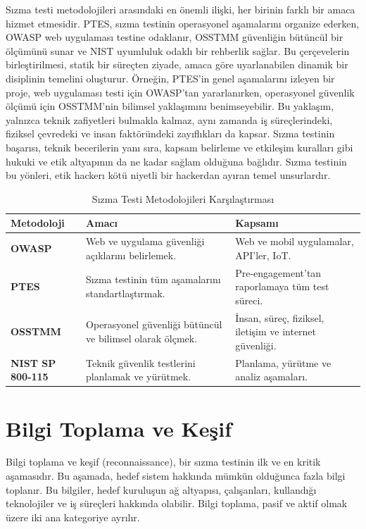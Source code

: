 Sızma testi metodolojileri arasındaki en önemli ilişki, her birinin farklı bir amaca hizmet etmesidir. PTES, sızma testinin operasyonel aşamalarını organize ederken, OWASP web uygulaması testine odaklanır, OSSTMM güvenliğin bütüncül bir ölçümünü sunar ve NIST uyumluluk odaklı bir rehberlik sağlar. Bu çerçevelerin birleştirilmesi, statik bir süreçten ziyade, amaca göre uyarlanabilen dinamik bir disiplinin temelini oluşturur. Örneğin, PTES'in genel aşamalarını izleyen bir proje, web uygulaması testi için OWASP'tan yararlanırken, operasyonel güvenlik ölçümü için OSSTMM'nin bilimsel yaklaşımını benimseyebilir. Bu yaklaşım, yalnızca teknik zafiyetleri bulmakla kalmaz, aynı zamanda iş süreçlerindeki, fiziksel çevredeki ve insan faktöründeki zayıflıkları da kapsar. Sızma testinin başarısı, teknik becerilerin yanı sıra, kapsam belirleme ve etkileşim kuralları gibi hukuki ve etik altyapının da ne kadar sağlam olduğuna bağlıdır. Sızma testinin bu yönleri, etik hackerı kötü niyetli bir hackerdan ayıran temel unsurlardır.

\begin{table}[h]
\centering
\begin{tabularx}{\textwidth}{|X|X|X|}
\hline
\rowcolor{tableheadcolor}
\textbf{Metodoloji} & \textbf{Amacı} & \textbf{Kapsamı}  \\
\hline
\textbf{OWASP} & Web ve uygulama güvenliği açıklarını belirlemek. & Web ve mobil uygulamalar, API'ler, IoT.  \\
\hline
\textbf{PTES} & Sızma testinin tüm aşamalarını standartlaştırmak. & Pre-engagement'tan raporlamaya tüm test süreci.  \\
\hline
\textbf{OSSTMM} & Operasyonel güvenliği bütüncül ve bilimsel olarak ölçmek. & İnsan, süreç, fiziksel, iletişim ve internet güvenliği.  \\
\hline
\textbf{NIST SP 800-115} & Teknik güvenlik testlerini planlamak ve yürütmek. & Planlama, yürütme ve analiz aşamaları.  \\
\hline
\end{tabularx}
\caption{Sızma Testi Metodolojileri Karşılaştırması}
\label{tab:pentest_methods}
\end{table}


\section{Bilgi Toplama ve Keşif}

Bilgi toplama ve keşif (reconnaissance), bir sızma testinin ilk ve en kritik aşamasıdır. Bu aşamada, hedef sistem hakkında mümkün olduğunca fazla bilgi toplanır. Bu bilgiler, hedef kuruluşun ağ altyapısı, çalışanları, kullandığı teknolojiler ve iş süreçleri hakkında olabilir. Bilgi toplama, pasif ve aktif olmak üzere iki ana kategoriye ayrılır.


